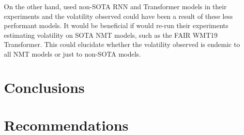 \documentclass[11pt,a4paper]{article}
\begin{document}
On the other hand, \citet{fadaee2020unreasonable} used non-SOTA RNN and Transformer models in their experiments and the volatility observed could have been a result of these less performant models. It would be beneficial if \citet{fadaee2020unreasonable} would re-run their experiments estimating volatility on SOTA NMT models, such as the FAIR WMT19 Transformer. This could elucidate whether the volatility observed is endemic to all NMT models or just to non-SOTA models. 


\section{Conclusions}


\section{Recommendations}



\clearpage



\end{document}
